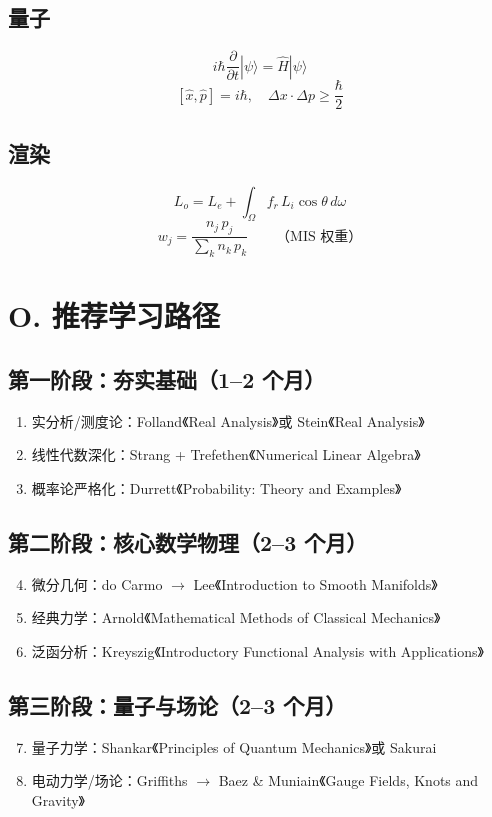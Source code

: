 \subsection{量子}
\[
i\hbar\frac{\partial}{\partial t}|\psi\rangle = \hat{H}|\psi\rangle
\]
\[
[\hat{x}, \hat{p}] = i\hbar, \quad \Delta x \cdot \Delta p \geq \frac{\hbar}{2}
\]

\subsection{渲染}
\[
L_o = L_e + \int_\Omega f_r\, L_i \cos\theta\, d\omega
\]
\[
w_j = \frac{n_j\, p_j}{\sum_k n_k\, p_k} \qquad \text{（MIS 权重）}
\]

\section{O. 推荐学习路径}

\subsection{第一阶段：夯实基础（1--2 个月）}
\begin{enumerate}
  \item 实分析/测度论：Folland《Real Analysis》或 Stein《Real Analysis》
  \item 线性代数深化：Strang + Trefethen《Numerical Linear Algebra》
  \item 概率论严格化：Durrett《Probability: Theory and Examples》
\end{enumerate}

\subsection{第二阶段：核心数学物理（2--3 个月）}
\begin{enumerate}
  \setcounter{enumi}{3}
  \item 微分几何：do Carmo $\to$ Lee《Introduction to Smooth Manifolds》
  \item 经典力学：Arnold《Mathematical Methods of Classical Mechanics》
  \item 泛函分析：Kreyszig《Introductory Functional Analysis with Applications》
\end{enumerate}

\subsection{第三阶段：量子与场论（2--3 个月）}
\begin{enumerate}
  \setcounter{enumi}{6}
  \item 量子力学：Shankar《Principles of Quantum Mechanics》或 Sakurai
  \item 电动力学/场论：Griffiths $\to$ Baez \& Muniain《Gauge Fields, Knots and Gravity》
\end{enumerate}

